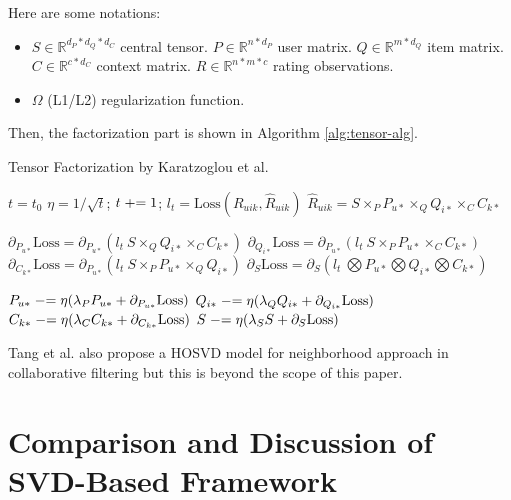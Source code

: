 \documentclass[letter paper, 11pt]{article}
\begin{document}
	Here are some notations: 
	\begin{itemize}
		\item $S\in \mathbb{R}^{d_P*d_Q*d_C}$ central tensor. $P \in \mathbb{R}^{n*d_P}$ user matrix. $Q \in \mathbb{R}^{m*d_Q}$ item matrix. $C\in \mathbb{R}^{c*d_C}$ context matrix. $R \in \mathbb{R}^{n * m * c}$ rating observations.
		
		\item $\Omega$ (L1/L2) regularization function.
	\end{itemize}

	Then, the factorization part is shown in Algorithm \ref{alg:tensor-alg}.
	
	\begin{algorithm}[h]
		\caption{Tensor Factorization by Karatzoglou et al.\cite{tensor}}
		\label{alg:tensor-alg}
		\begin{algorithmic}
			\STATE $t = t_0$
				\STATE $\eta = 1/\sqrt{t}$; $t \mathrel{+}= 1$; $l_t = \text{Loss}(R_{uik}, \hat{R}_{uik})$
				\STATE $\hat{R}_{uik} = S \times_P P_{u*} \times_Q Q_{i*} \times_C C_{k*}$
				
				\STATE $\partial_{P_{u*}} \text{Loss} = \partial_{P_{u*}} (l_t\ S \times_Q Q_{i*} \times_C C_{k*})$
				\STATE $\partial_{Q_{i*}} \text{Loss} = \partial_{P_{u*}} (l_t\ S \times_P P_{u*} \times_C C_{k*})$
				\STATE $\partial_{C_{k*}} \text{Loss} = \partial_{P_{u*}} (l_t\ S \times_P P_{u*} \times_Q Q_{i*})$
				\STATE $\partial_{S} \text{Loss} = \partial_{S} (l_t\ \bigotimes P_{u*} \bigotimes Q_{i*} \bigotimes C_{k*})$
												
				\STATE $P_{u*} \mathrel{-}= \eta(\lambda_P P_{u*} + \partial_{P_{u*}} \text{Loss})$
				\STATE $Q_{i*} \mathrel{-}= \eta(\lambda_Q Q_{i*} + \partial_{Q_{i*}} \text{Loss})$
				\STATE $C_{k*} \mathrel{-}= \eta(\lambda_C C_{k*} + \partial_{C_{k*}} \text{Loss})$
				\STATE $S \mathrel{-}= \eta(\lambda_S S + \partial_{S} \text{Loss})$
			\ENDWHILE
		\end{algorithmic}
	\end{algorithm}

	Tang et al. also propose a HOSVD model for neighborhood approach in collaborative filtering \cite{tensor-neighbor} but this is beyond the scope of this paper.
	
	
	\section{Comparison and Discussion of SVD-Based Framework}
\end{document}
